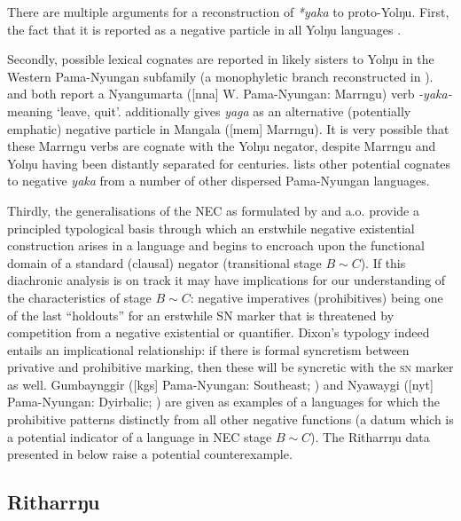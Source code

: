 \documentclass[output=paper,draft,draftmode,colorlinks,citecolor=brown]{langscibook}
\begin{document}
There are multiple arguments for a reconstruction of \textit{*yaka} to proto-Yolŋu. First, the fact that it is reported as a negative particle in all Yolŋu languages \citep[31]{Schebeck2001}.

Secondly, possible lexical cognates are reported in likely sisters to Yolŋu
in the Western Pama-Nyungan subfamily (a monophyletic branch reconstructed
in \citealt[838]{Bowern2012}). \citet[226]{Sharp2004} and
\citet[67]{Ogrady1963} both report a Nyangumarta ([nna] W.
Pama-Nyungan: Marrngu) verb \textit{-yaka-} meaning `leave, quit'.
\citet[35]{Mckelson1974} additionally gives \textit{yaga} as an alternative
(potentially emphatic) negative particle in Mangala ([mem] Marrngu). It is very possible that these Marrngu verbs are cognate with the Yolŋu negator, despite Marrngu and Yolŋu having been distantly separated for centuries. \citet[85]{Dixon2002a} lists other potential cognates to negative \textit{yaka} from a number of other dispersed Pama-Nyungan languages.
 
Thirdly, the generalisations of the NEC as formulated by \citet{Croft1991}
and \citet{Veselinova2016} a.o. provide a principled typological basis
through which an erstwhile negative existential construction arises in a
language and begins to encroach upon the functional domain of a standard
(clausal) negator (transitional stage $B\sim C$). If this diachronic
analysis is on track it may have implications for our understanding of the
characteristics of stage $B\sim C$: negative imperatives (prohibitives)
being one of the last ``holdouts'' for an erstwhile SN marker that is
threatened by competition from a negative existential or quantifier.
Dixon's typology \citeyearpar[84]{Dixon2002a} indeed entails an
implicational relationship: if there is formal syncretism between privative
and prohibitive marking, then these will be syncretic with the \textsc{sn}
marker as well. Gumbaynggir ([kgs] Pama-Nyungan: Southeast;
\citealt{Eades1979}) and Nyawaygi ([nyt] Pama-Nyungan:
Dyirbalic; \citealt{Dixon1983}) are given as examples of a
languages for which the prohibitive patterns distinctly from all other
negative functions (a datum which is a potential indicator of a language in
NEC stage $B\sim C$). The Ritharrŋu data presented in  below raise a potential counterexample.

\subsection{Ritharrŋu}\label{sec:austr-4.2}
\end{document}
